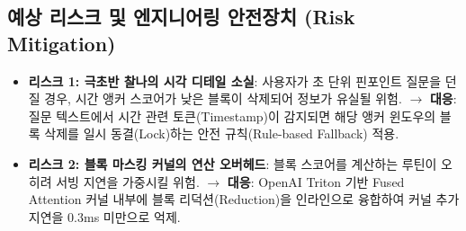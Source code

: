 \documentclass[10pt, a4paper, twocolumn]{article}
\begin{document}
\subsection{예상 리스크 및 엔지니어링 안전장치 (Risk Mitigation)}
\begin{itemize}
    \item \textbf{리스크 1: 극초반 찰나의 시각 디테일 소실}: 사용자가 초 단위 핀포인트 질문을 던질 경우, 시간 앵커 스코어가 낮은 블록이 삭제되어 정보가 유실될 위험. $\rightarrow$ \textbf{대응}: 질문 텍스트에서 시간 관련 토큰(Timestamp)이 감지되면 해당 앵커 윈도우의 블록 삭제를 일시 동결(Lock)하는 안전 규칙(Rule-based Fallback) 적용.
    \item \textbf{리스크 2: 블록 마스킹 커널의 연산 오버헤드}: 블록 스코어를 계산하는 루틴이 오히려 서빙 지연을 가중시킬 위험. $\rightarrow$ \textbf{대응}: OpenAI Triton 기반 Fused Attention 커널 내부에 블록 리덕션(Reduction)을 인라인으로 융합하여 커널 추가 지연을 0.3ms 미만으로 억제.
\end{itemize}
\end{document}
